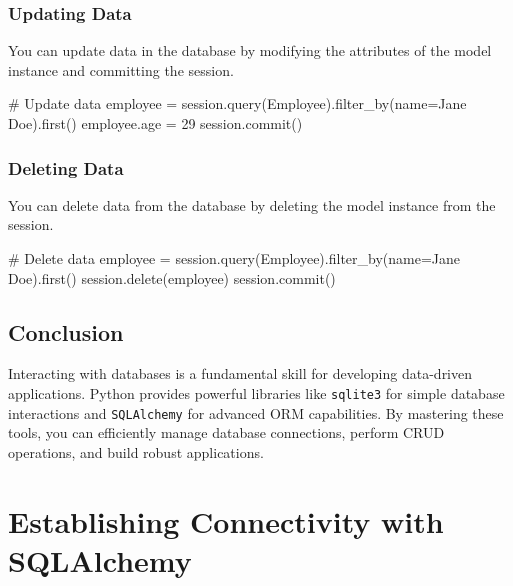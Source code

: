 \documentclass[
  letterpaper,
  DIV=11,
  numbers=noendperiod]{scrreprt}
\newenvironment{Shaded}{\begin{snugshade}}{\end{snugshade}}
\newcommand{\CommentTok}[1]{\textcolor[rgb]{0.37,0.37,0.37}{#1}}
\newcommand{\DecValTok}[1]{\textcolor[rgb]{0.68,0.00,0.00}{#1}}
\newcommand{\NormalTok}[1]{\textcolor[rgb]{0.00,0.23,0.31}{#1}}
\newcommand{\OperatorTok}[1]{\textcolor[rgb]{0.37,0.37,0.37}{#1}}
\newcommand{\StringTok}[1]{\textcolor[rgb]{0.13,0.47,0.30}{#1}}
\begin{document}
\subsubsection{Updating Data}\label{updating-data-1}

You can update data in the database by modifying the attributes of the
model instance and committing the session.

\begin{Shaded}
\begin{Highlighting}[]
\CommentTok{\# Update data}
\NormalTok{employee }\OperatorTok{=}\NormalTok{ session.query(Employee).filter\_by(name}\OperatorTok{=}\StringTok{\textquotesingle{}Jane Doe\textquotesingle{}}\NormalTok{).first()}
\NormalTok{employee.age }\OperatorTok{=} \DecValTok{29}
\NormalTok{session.commit()}
\end{Highlighting}
\end{Shaded}

\subsubsection{Deleting Data}\label{deleting-data-1}

You can delete data from the database by deleting the model instance
from the session.

\begin{Shaded}
\begin{Highlighting}[]
\CommentTok{\# Delete data}
\NormalTok{employee }\OperatorTok{=}\NormalTok{ session.query(Employee).filter\_by(name}\OperatorTok{=}\StringTok{\textquotesingle{}Jane Doe\textquotesingle{}}\NormalTok{).first()}
\NormalTok{session.delete(employee)}
\NormalTok{session.commit()}
\end{Highlighting}
\end{Shaded}

\subsection{Conclusion}\label{conclusion-15}

Interacting with databases is a fundamental skill for developing
data-driven applications. Python provides powerful libraries like
\texttt{sqlite3} for simple database interactions and
\texttt{SQLAlchemy} for advanced ORM capabilities. By mastering these
tools, you can efficiently manage database connections, perform CRUD
operations, and build robust applications.

\section{Establishing Connectivity with
SQLAlchemy}\label{establishing-connectivity-with-sqlalchemy}
\end{document}
